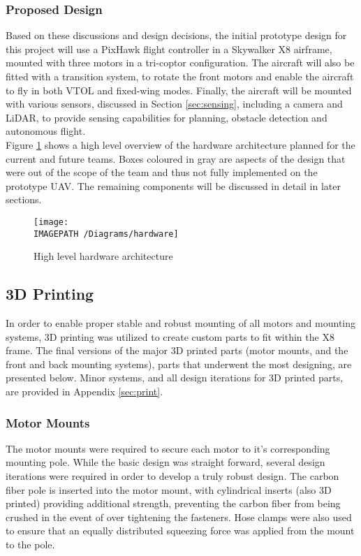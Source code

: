 \subsubsection*{Proposed Design}
Based on these discussions and design decisions, the initial prototype design for this project will use a PixHawk flight controller in a Skywalker X8 airframe, mounted with three motors in a tri-coptor configuration. The aircraft will also be fitted with a transition system, to rotate the front motors and enable the aircraft to fly in both VTOL and fixed-wing modes. Finally, the aircraft will be mounted with various sensors, discussed in Section \ref{sec:sensing}, including a camera and LiDAR, to provide sensing capabilities for planning, obstacle detection and autonomous flight.\\

Figure \ref{fig:hardwarearch} shows a high level overview of the hardware architecture planned for the current and future teams. Boxes coloured in gray are aspects of the design that were out of the scope of the \ID team and thus not fully implemented on the prototype UAV. The remaining components will be discussed in detail in later sections.

\begin{figure}[!h]
	\centering
	\texttt{[image: \\IMAGEPATH /Diagrams/hardware]}
	\caption{High level hardware architecture}
	\label{fig:hardwarearch}
\end{figure}

\subsection{3D Printing}
In order to enable proper stable and robust mounting of all motors and mounting systems, 3D printing was utilized to create custom parts to fit within the X8 frame. The final versions of the major 3D printed parts (motor mounts, and the front and back mounting systems), parts that underwent the most designing, are presented below. Minor systems, and all design iterations for 3D printed parts, are provided in Appendix \ref{sec:print}.\\

\subsubsection*{Motor Mounts}
The motor mounts were required to secure each motor to it's corresponding mounting pole. While the basic design was straight forward, several design iterations were required in order to develop a truly robust design. The carbon fiber pole is inserted into the motor mount, with cylindrical inserts (also 3D printed) providing additional strength, preventing the carbon fiber from being crushed in the event of over tightening the fasteners. Hose clamps were also used to ensure that an equally distributed squeezing force was applied from the mount to the pole.

